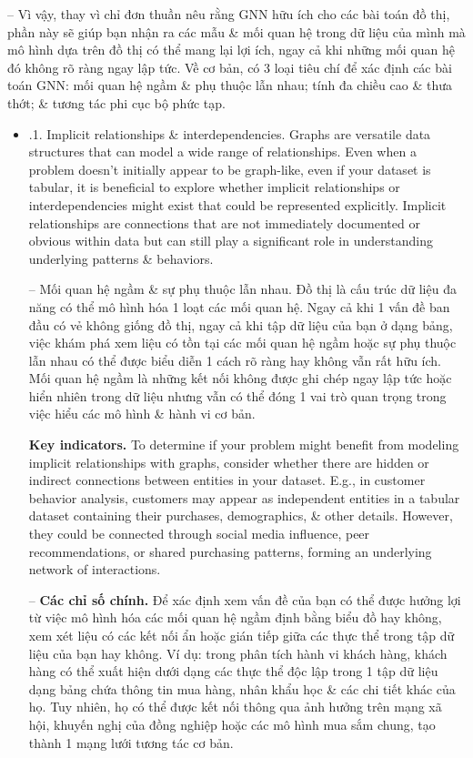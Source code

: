 \documentclass{article}
\begin{document}
\begin{itemize}
\begin{itemize}
        -- Vì vậy, thay vì chỉ đơn thuần nêu rằng GNN hữu ích cho các bài toán đồ thị, phần này sẽ giúp bạn nhận ra các mẫu \& mối quan hệ trong dữ liệu của mình mà mô hình dựa trên đồ thị có thể mang lại lợi ích, ngay cả khi những mối quan hệ đó không rõ ràng ngay lập tức. Về cơ bản, có 3 loại tiêu chí để xác định các bài toán GNN: mối quan hệ ngầm \& phụ thuộc lẫn nhau; tính đa chiều cao \& thưa thớt; \& tương tác phi cục bộ phức tạp.
        \begin{itemize}
            \item {.1. Implicit relationships \& interdependencies.} Graphs are versatile data structures that can model a wide range of relationships. Even when a problem doesn't initially appear to be graph-like, even if your dataset is tabular, it is beneficial to explore whether implicit relationships or interdependencies might exist that could be represented explicitly. Implicit relationships are connections that are not immediately documented or obvious within data but can still play a significant role in understanding underlying patterns \& behaviors.

            -- {\sf Mối quan hệ ngầm \& sự phụ thuộc lẫn nhau.} Đồ thị là cấu trúc dữ liệu đa năng có thể mô hình hóa 1 loạt các mối quan hệ. Ngay cả khi 1 vấn đề ban đầu có vẻ không giống đồ thị, ngay cả khi tập dữ liệu của bạn ở dạng bảng, việc khám phá xem liệu có tồn tại các mối quan hệ ngầm hoặc sự phụ thuộc lẫn nhau có thể được biểu diễn 1 cách rõ ràng hay không vẫn rất hữu ích. Mối quan hệ ngầm là những kết nối không được ghi chép ngay lập tức hoặc hiển nhiên trong dữ liệu nhưng vẫn có thể đóng 1 vai trò quan trọng trong việc hiểu các mô hình \& hành vi cơ bản.

            {\bf Key indicators.} To determine if your problem might benefit from modeling implicit relationships with graphs, consider whether there are hidden or indirect connections between entities in your dataset. E.g., in customer behavior analysis, customers may appear as independent entities in a tabular dataset containing their purchases, demographics, \& other details. However, they could be connected through social media influence, peer recommendations, or shared purchasing patterns, forming an underlying network of interactions.

            -- {\bf Các chỉ số chính.} Để xác định xem vấn đề của bạn có thể được hưởng lợi từ việc mô hình hóa các mối quan hệ ngầm định bằng biểu đồ hay không, xem xét liệu có các kết nối ẩn hoặc gián tiếp giữa các thực thể trong tập dữ liệu của bạn hay không. Ví dụ: trong phân tích hành vi khách hàng, khách hàng có thể xuất hiện dưới dạng các thực thể độc lập trong 1 tập dữ liệu dạng bảng chứa thông tin mua hàng, nhân khẩu học \& các chi tiết khác của họ. Tuy nhiên, họ có thể được kết nối thông qua ảnh hưởng trên mạng xã hội, khuyến nghị của đồng nghiệp hoặc các mô hình mua sắm chung, tạo thành 1 mạng lưới tương tác cơ bản.


\end{itemize}
\end{itemize}
\end{itemize}
\end{document}
